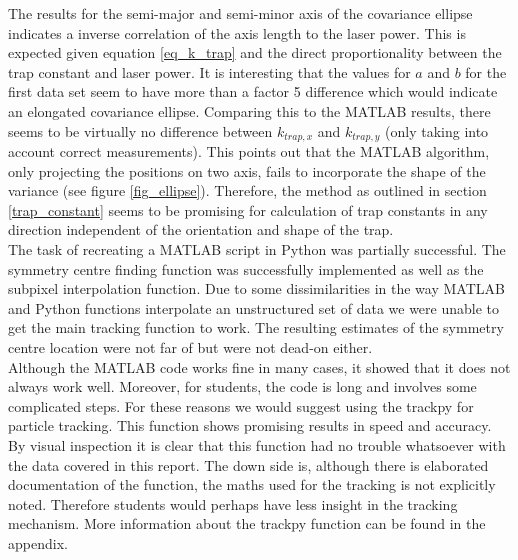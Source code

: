 The results for the semi-major and semi-minor axis of the covariance ellipse indicates a inverse correlation of the axis length to the laser power. This is expected given equation \ref{eq_k_trap} and the direct proportionality between the trap constant and laser power. It is interesting that the values for $a$ and $b$ for the first data set seem to have more than a factor 5 difference which would indicate an elongated covariance ellipse. Comparing this to the MATLAB results, there seems to be virtually no difference between $k_{trap,x}$ and $k_{trap,y}$ (only taking into account correct measurements). This points out that the MATLAB algorithm, only projecting the positions on two axis, fails to incorporate the shape of the variance (see figure \ref{fig_ellipse}). Therefore, the method as outlined in section \ref{trap_constant} seems to be promising for calculation of trap constants in any direction independent of the orientation and shape of the trap. \\
The task of recreating a MATLAB script in Python was partially successful. The symmetry centre finding function was successfully implemented as well as the subpixel interpolation function. Due to some dissimilarities in the way MATLAB and Python functions interpolate an unstructured set of data we were unable to get the main tracking function to work. The resulting estimates of the symmetry centre location were not far of but were not dead-on either. \\
Although the MATLAB code works fine in many cases, it showed that it does not always work well. Moreover, for students, the code is long and involves some complicated steps. For these reasons we would suggest using the trackpy for particle tracking. This function shows promising results in speed and accuracy. By visual inspection it is clear that this function had no trouble whatsoever with the data covered in this report. The down side is, although there is elaborated documentation of the function, the maths used for the tracking is not explicitly noted. Therefore students would perhaps have less insight in the tracking mechanism. More information about the trackpy function can be found in the appendix.
